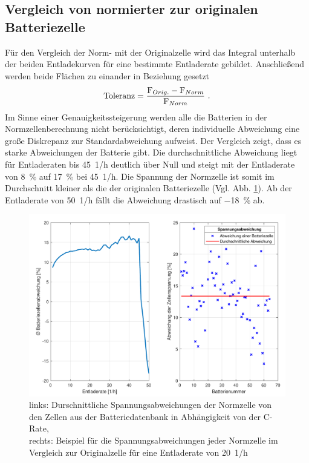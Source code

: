 \begin{appendix}
\section{Vergleich von normierter zur originalen Batteriezelle}
\label{sec:norm_vs_orig}
Für den Vergleich der Norm- mit der Originalzelle wird das Integral unterhalb der beiden Entladekurven für eine bestimmte Entladerate gebildet. Anschließend werden beide Flächen zu einander in Beziehung gesetzt 
\begin{equation}
	\text{Toleranz} = \frac{\text{F}_{Orig.}-\text{F}_{Norm}}{\text{F}_{Norm}} ~\text{.}
\end{equation} 
Im Sinne einer Genauigkeitssteigerung werden alle die Batterien in der Normzellenberechnung nicht berücksichtigt, deren individuelle Abweichung eine große Diskrepanz zur Standardabweichung aufweist. Der Vergleich zeigt, dass es starke Abweichungen der Batterie gibt. Die durchschnittliche Abweichung liegt für Entladeraten bis \SI{45}{1/h} deutlich über Null und steigt mit der Entladerate von \SI{8}{\%} auf \SI{17}{\%} bei \SI{45}{1/h}. Die Spannung der Normzelle ist somit im Durchschnitt kleiner als die der originalen Batteriezelle (Vgl. Abb. \ref{abb:batterie_abweichungen}). Ab der Entladerate von \SI{50}{1/h} fällt die Abweichung drastisch auf \SI{-18}{\%} ab. 
\begin{figure}[H]
\centering
	\includegraphics[scale=0.7]{Diagramme/Abweichungen.pdf}
	\caption{links: Durschnittliche Spannungsabweichungen der Normzelle von den Zellen aus der Batteriedatenbank in Abhängigkeit von der C-Rate,\\ rechts: Beispiel für die Spannungsabweichungen jeder Normzelle im Vergleich zur Originalzelle für eine Entladerate von \SI{20}{1/h}
	 }
	\label{abb:batterie_abweichungen}
\end{figure}



\end{appendix}
